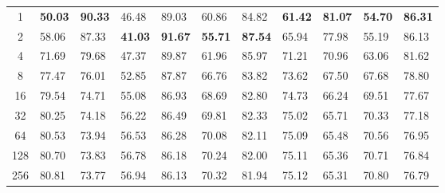 \documentclass{article}
\begin{document}
\begin{table}[h]
{\begin{tabular}{c|C{0.04\textwidth}C{0.05\textwidth}|C{0.04\textwidth}C{0.05\textwidth}|C{0.04\textwidth}C{0.05\textwidth}|C{0.04\textwidth}C{0.05\textwidth}|C{0.04\textwidth}C{0.05\textwidth}}
1                                     & \textbf{50.03}       & \textbf{90.33}        & 46.48                & 89.03                 & 60.86                & 84.82                 & \textbf{61.42}       & \textbf{81.07}        & \textbf{54.70}       & \textbf{86.31}       \\
2                                     & 58.06                & 87.33                 & \textbf{41.03}       & \textbf{91.67}        & \textbf{55.71}       & \textbf{87.54}        & 65.94                & 77.98                 & 55.19                & 86.13                \\
4                                     & 71.69                & 79.68                 & 47.37                & 89.87                 & 61.96                & 85.97                 & 71.21                & 70.96                 & 63.06                & 81.62                \\
8                                     & 77.47                & 76.01                 & 52.85                & 87.87                 & 66.76                & 83.82                 & 73.62                & 67.50                 & 67.68                & 78.80                \\
16                                    & 79.54                & 74.71                 & 55.08                & 86.93                 & 68.69                & 82.80                 & 74.73                & 66.24                 & 69.51                & 77.67                \\
32                                    & 80.25                & 74.18                 & 56.22                & 86.49                 & 69.81                & 82.33                 & 75.02                & 65.71                 & 70.33                & 77.18                \\
64                                    & 80.53                & 73.94                 & 56.53                & 86.28                 & 70.08                & 82.11                 & 75.09                & 65.48                 & 70.56                & 76.95                \\
128                                   & 80.70                & 73.83                 & 56.78                & 86.18                 & 70.24                & 82.00                 & 75.11                & 65.36                 & 70.71                & 76.84                \\
256                                   & 80.81                & 73.77                 & 56.94                & 86.13                 & 70.32                & 81.94                 & 75.12                & 65.31                 & 70.80                & 76.79                \\

\end{tabular}}
\end{table}
\end{document}
